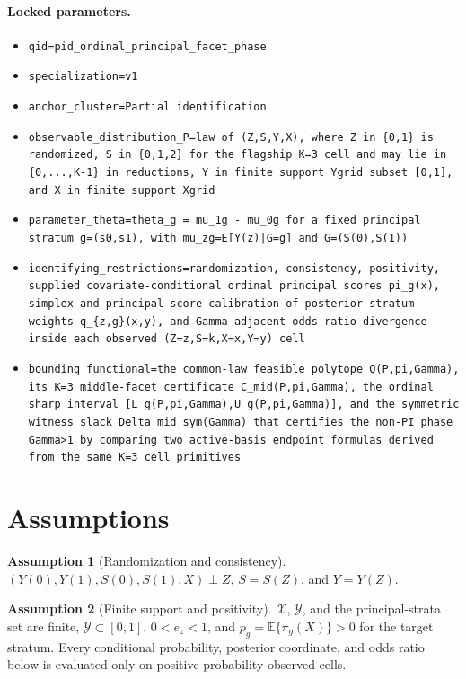 \documentclass[11pt]{article}
\newcommand{\E}{\mathbb{E}}
\theoremstyle{definition}
\newtheorem{assumption}{Assumption}
\theoremstyle{plain}
\theoremstyle{remark}
\begin{document}
\paragraph{Locked parameters.}
\begin{itemize}
  \item \texttt{qid=pid\_ordinal\_principal\_facet\_phase}
  \item \texttt{specialization=v1}
  \item \texttt{anchor\_cluster=Partial identification}
  \item \texttt{observable\_distribution\_P=law of (Z,S,Y,X), where Z in \{0,1\} is randomized, S in \{0,1,2\} for the flagship K=3 cell and may lie in \{0,...,K-1\} in reductions, Y in finite support Ygrid subset [0,1], and X in finite support Xgrid}
  \item \texttt{parameter\_theta=theta\_g = mu\_1g - mu\_0g for a fixed principal stratum g=(s0,s1), with mu\_zg=E[Y(z)|G=g] and G=(S(0),S(1))}
  \item \texttt{identifying\_restrictions=randomization, consistency, positivity, supplied covariate-conditional ordinal principal scores pi\_g(x), simplex and principal-score calibration of posterior stratum weights q\_\{z,g\}(x,y), and Gamma-adjacent odds-ratio divergence inside each observed (Z=z,S=k,X=x,Y=y) cell}
  \item \texttt{bounding\_functional=the common-law feasible polytope Q(P,pi,Gamma), its K=3 middle-facet certificate C\_mid(P,pi,Gamma), the ordinal sharp interval [L\_g(P,pi,Gamma),U\_g(P,pi,Gamma)], and the symmetric witness slack Delta\_mid\_sym(Gamma) that certifies the non-PI phase Gamma>1 by comparing two active-basis endpoint formulas derived from the same K=3 cell primitives}
\end{itemize}

\section{Assumptions}
\begin{assumption}[Randomization and consistency]\label{ass:randomization}
\((Y(0),Y(1),S(0),S(1),X)\perp Z\), \(S=S(Z)\), and \(Y=Y(Z)\).
\end{assumption}

\begin{assumption}[Finite support and positivity]\label{ass:positivity}
\(\mathcal X\), \(\mathcal Y\), and the principal-strata set are finite, \(\mathcal Y\subset[0,1]\), \(0<e_z<1\), and \(p_g=\E\{\pi_g(X)\}>0\) for the target stratum.  Every conditional probability, posterior coordinate, and odds ratio below is evaluated only on positive-probability observed cells.
\end{assumption}
\end{document}
